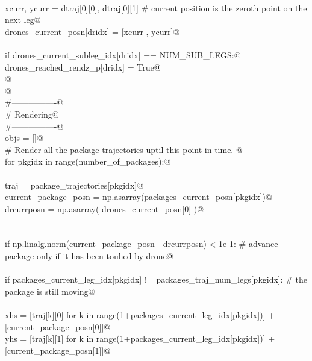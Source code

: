\documentclass[10.0pt]{report}
\begin{document}
\begin{appendices}
\begin{flushleft}
\begin{list}{}{}
\mbox{}\verb@@\\
\mbox{}\verb@                    xcurr, ycurr = dtraj[0][0], dtraj[0][1] # current position is the zeroth point on the next leg@\\
\mbox{}\verb@                    drones_current_posn[dridx]  = [xcurr , ycurr]@\\
\mbox{}\verb@@\\
\mbox{}\verb@                    if drones_current_subleg_idx[dridx] == NUM_SUB_LEGS:@\\
\mbox{}\verb@                        drones_reached_rendz_p[dridx] = True@\\
\mbox{}\verb@           @\\
\mbox{}\verb@         @\\
\mbox{}\verb@        #----------------@\\
\mbox{}\verb@        # Rendering@\\
\mbox{}\verb@        #----------------@\\
\mbox{}\verb@        objs = []@\\
\mbox{}\verb@        # Render all the package trajectories uptil this point in time.  @\\
\mbox{}\verb@        for pkgidx in range(number_of_packages):@\\
\mbox{}\verb@@\\
\mbox{}\verb@          traj                 = package_trajectories[pkgidx]@\\
\mbox{}\verb@          current_package_posn = np.asarray(packages_current_posn[pkgidx])@\\
\mbox{}\verb@          drcurrposn           = np.asarray( drones_current_posn[0]  )@\\
\mbox{}\verb@@\\
\mbox{}\verb@@\\
\mbox{}\verb@          if np.linalg.norm(current_package_posn - drcurrposn) < 1e-1: # advance package only if it has been touhed by drone@\\
\mbox{}\verb@@\\
\mbox{}\verb@            if packages_current_leg_idx[pkgidx] != packages_traj_num_legs[pkgidx]: # the package is still moving@\\
\mbox{}\verb@@\\
\mbox{}\verb@                  xhs = [traj[k][0] for k in range(1+packages_current_leg_idx[pkgidx])] + [current_package_posn[0]]@\\
\mbox{}\verb@                  yhs = [traj[k][1] for k in range(1+packages_current_leg_idx[pkgidx])] + [current_package_posn[1]]@\\

\end{list}
\end{flushleft}
\end{appendices}
\end{document}

